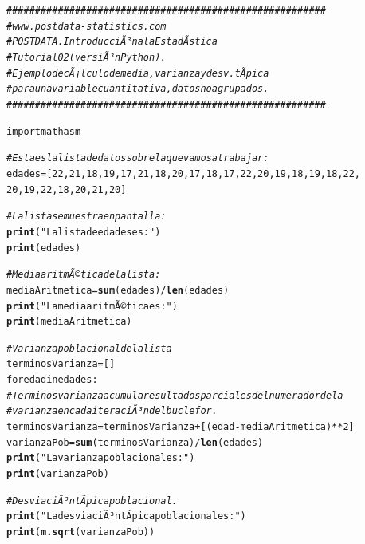 \documentclass[10pt,a4paper]{article}\usepackage[]{graphicx}\usepackage[]{color}
\makeatletter
\newcommand{\hlstr}[1]{\textcolor[rgb]{0.192,0.494,0.8}{#1}}%
\newcommand{\hlcom}[1]{\textcolor[rgb]{0.678,0.584,0.686}{\textit{#1}}}%
\newcommand{\hlkwd}[1]{\textcolor[rgb]{0.737,0.353,0.396}{\textbf{#1}}}%
\newenvironment{kframe}{%
 \def\at@end@of@kframe{}%
 \ifinner\ifhmode%
  \def\at@end@of@kframe{\end{minipage}}%
  \begin{minipage}{\columnwidth}%
 \fi\fi%
 \def\FrameCommand##1{\hskip\@totalleftmargin \hskip-\fboxsep
 \colorbox{shadecolor}{##1}\hskip-\fboxsep
     \hskip-\linewidth \hskip-\@totalleftmargin \hskip\columnwidth}%
 \MakeFramed {\advance\hsize-\width
   \@totalleftmargin\z@ \linewidth\hsize
   \@setminipage}}%
 {\par\unskip\endMakeFramed%
 \at@end@of@kframe}
\newenvironment{knitrout}{}{} %
\makeatother
\begin{document}
\begin{knitrout}
\color{fgcolor}\begin{kframe}
\begin{alltt}
\hlcom{########################################################}
\hlcom{# www.postdata -statistics.com}
\hlcom{# POSTDATA. IntroducciÃ³n a la EstadÃ­stica}
\hlcom{# Tutorial 02 (versiÃ³n Python).}
\hlcom{# Ejemplo de cÃ¡lculo de media, varianza y desv. tÃ­pica}
\hlcom{# para una variable cuantitativa, datos no agrupados.}
\hlcom{########################################################}

import math as m

\hlcom{# Esta es la lista de datos sobre la que vamos a trabajar:}
edades = [22, 21, 18, 19, 17, 21, 18, 20, 17, 18, 17, 22, 20, 19, 18, 19, 18, 22, 
20, 19, 22, 18, 20, 21, 20]

\hlcom{# La lista se muestra en pantalla:}
\hlkwd{print}(\hlstr{"La lista de edades es:"})
\hlkwd{print}(edades)

\hlcom{# Media aritmÃ©tica de la lista:}
mediaAritmetica = \hlkwd{sum}(edades) / \hlkwd{len}(edades)
\hlkwd{print}(\hlstr{"La media aritmÃ©tica es:"})
\hlkwd{print}(mediaAritmetica)

\hlcom{# Varianza poblacional de la lista}
terminosVarianza = []
for edad in edades:
\hlcom{  # Terminos varianza acumula resultados parciales del numerador de la }
\hlcom{  # varianza en cada iteraciÃ³n del bucle for.}
  terminosVarianza = terminosVarianza + [(edad - mediaAritmetica)**2] 
varianzaPob = \hlkwd{sum}(terminosVarianza) / \hlkwd{len}(edades)
\hlkwd{print}(\hlstr{"La varianza poblacional es:"})
\hlkwd{print}(varianzaPob)

\hlcom{# DesviaciÃ³n tÃ­pica poblacional.}
\hlkwd{print}(\hlstr{"La desviaciÃ³n tÃ­pica poblacional es:"})
\hlkwd{print}(\hlkwd{m.sqrt}(varianzaPob))
\end{alltt}
\end{kframe}
\end{knitrout}
\end{document}
